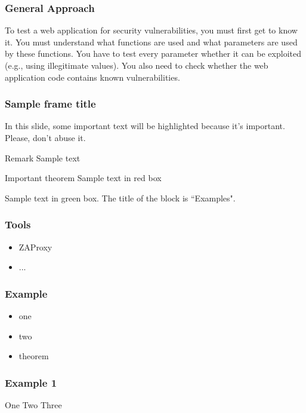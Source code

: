 \documentclass[aspectratio=169]{beamer}
\begin{document}
\begin{frame}
    \frametitle{General Approach}
    To test a web application for security vulnerabilities, you must first get to know it. You must understand what functions are used and what parameters are used by these functions. You have to test every parameter whether it can be exploited (e.g., using illegitimate values). You also need to check whether the web application code contains known vulnerabilities.
    

\end{frame}

\begin{frame}
    \frametitle{Sample frame title}
    
    In this slide, some important text will be
    \alert{highlighted} because it's important.
    Please, don't abuse it.
    
    \begin{block}{Remark}
    Sample text
    \end{block}
    
    \begin{alertblock}{Important theorem}
    Sample text in red box
    \end{alertblock}
    
    \begin{examples}
    Sample text in green box. The title of the block is ``Examples".
    \end{examples}

\end{frame}

\begin{frame}
    \frametitle{Tools}
    \begin{itemize}
        \item ZAProxy
        \item ...
    \end{itemize}
\end{frame}


\begin{frame}
    \frametitle{Example}

    \begin{itemize}
        \item<1-> one
        \item<2-> two
        \item<3-> theorem
    \end{itemize}

\end{frame}

\begin{frame}
    \frametitle{Example 1}
    One \pause
    Two \pause
    Three
\end{frame}
\end{document}
